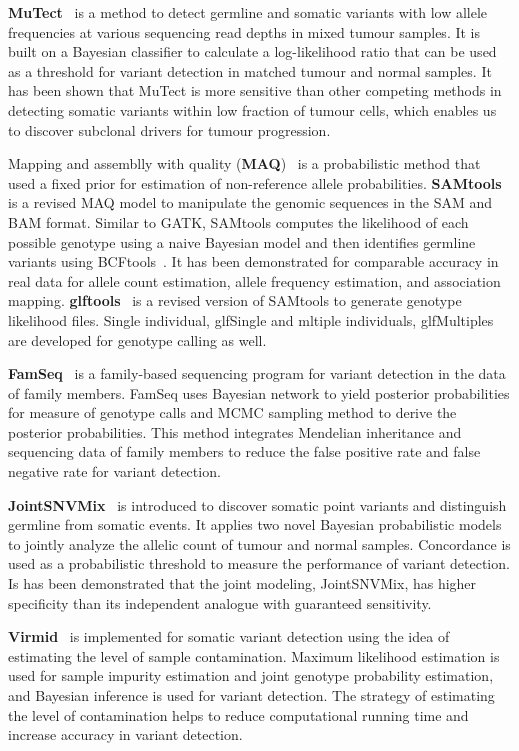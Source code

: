 \documentclass[a4,center,fleqn]{NAR}
\begin{document}
\textbf{MuTect}~\citep{Cibulskis2013} is a method to detect germline and somatic variants with low allele frequencies at various sequencing read depths in mixed tumour samples.
It is built on a Bayesian classifier to calculate a log-likelihood ratio that can be used as a threshold for variant detection in matched tumour and normal samples.
It has been shown that MuTect is more sensitive than other competing methods in detecting somatic variants within low fraction of tumour cells, which enables us to discover subclonal drivers for tumour progression.

Mapping and assemblly with quality (\textbf{MAQ})~\citep{Li2008} is a probabilistic method that used a fixed prior for estimation of non-reference allele probabilities.
\textbf{SAMtools}~\citep{Li2009a} is a revised MAQ model to manipulate the genomic sequences in the SAM and BAM format.
Similar to GATK, SAMtools computes the likelihood of each possible genotype using a naive Bayesian model and then identifies germline variants using BCFtools~\citep{li2011statistical}.
It has been demonstrated for comparable accuracy in real data for allele count estimation, allele frequency estimation, and association mapping.
\textbf{glftools}~\citep{abecasis2010} is a revised version of SAMtools to generate genotype likelihood files.
Single individual, glfSingle and mltiple individuals, glfMultiples are developed for genotype calling as well.

\textbf{FamSeq}~\citep{Peng2013} is a family-based sequencing program for variant detection in the data of family members.
FamSeq uses Bayesian network to yield posterior probabilities for measure of genotype calls and MCMC sampling method to derive the posterior probabilities.
This method integrates Mendelian inheritance and sequencing data of family members to reduce the false positive rate and false negative rate for variant detection.

\textbf{JointSNVMix}~\citep{Roth2012} is introduced to discover somatic point variants and distinguish germline from somatic events.
It applies two novel Bayesian probabilistic models to jointly analyze the allelic count of tumour and normal samples.
Concordance is used as a probabilistic threshold to measure the performance of variant detection.
Is has been demonstrated that the joint modeling, JointSNVMix, has higher specificity than its independent analogue with guaranteed sensitivity.

\textbf{Virmid}~\citep{Kim2013} is implemented for somatic variant detection using the idea of estimating the level of sample contamination.
Maximum likelihood estimation is used for sample impurity estimation and joint genotype probability estimation, and Bayesian inference is used for variant detection.
The strategy of estimating the level of contamination helps to reduce computational running time and increase accuracy in variant detection.
\end{document}
